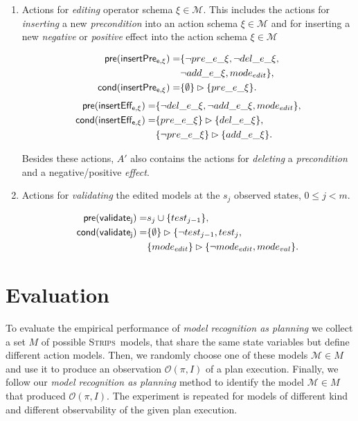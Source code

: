 \documentclass[letterpaper]{article} %
\newcommand{\pre}{\mathsf{pre}}     %
\newcommand{\cond}{\mathsf{cond}}   %
\newcommand{\strips}{\textsc{Strips}}     %
\begin{document}
\begin{itemize}
\begin{enumerate}
\item Actions for {\em editing} operator schema $\xi\in\mathcal{M}$. This includes the actions for {\em inserting} a new {\em precondition} into an action schema $\xi\in\mathcal{M}$ and for inserting a new {\em negative} or {\em positive} effect into the action schema $\xi\in\mathcal{M}$
\begin{small}
\begin{align*}
\hspace*{7pt}\pre(\mathsf{insertPre_{e,\xi}})=&\{\neg pre\_e\_\xi, \neg del\_e\_\xi,\\
& \neg add\_e\_\xi, mode_{edit}\},\\
\cond(\mathsf{insertPre_{e,\xi}})=&\{\emptyset\}\rhd\{pre\_e\_\xi\}.
\end{align*}
\begin{align*}
\hspace*{7pt}\pre(\mathsf{insertEff_{e,\xi}})=&\{\neg del\_e\_\xi, \neg add\_e\_\xi,mode_{edit}\},\\
\cond(\mathsf{insertEff_{e,\xi}})=&\{pre\_e\_\xi\}\rhd\{del\_e\_\xi\},\\
&\{\neg pre\_e\_\xi\}\rhd\{add\_e\_\xi\}.
\end{align*}
\end{small}
Besides these actions, $A'$ also contains the actions for {\em deleting} a {\em precondition} and a negative/positive {\em effect}.

\item Actions for {\em validating} the edited models at the $s_j$ observed states, {\tt\small $0\leq j< m$}.
\begin{small}
\begin{align*}
\hspace*{7pt}\pre(\mathsf{validate_{j}})=&s_j\cup\{test_{j-1}\},\\
\cond(\mathsf{validate_{j}})=&\{\emptyset\}\rhd\{\neg test_{j-1}, test_j,\\
                            &\{mode_{edit}\}\rhd\{\neg mode_{edit}, mode_{val}\}.
\end{align*}
\end{small}
\end{enumerate}
\end{itemize}


\section{Evaluation}
\label{sec:evaluation}
To evaluate the empirical performance of {\em model recognition as planning} we collect a set $M$ of possible \strips\ models, that share the same state variables but define different action models. Then, we randomly choose one of these models $\mathcal{M}\in M$ and use it to produce an observation $\mathcal{O}(\pi,I)$ of a plan execution. Finally, we follow our {\em model recognition as planning} method to identify the model $\mathcal{M}\in M$ that produced $\mathcal{O}(\pi,I)$. The experiment is repeated for models of different kind and different observability of the given plan execution.
\end{document}
